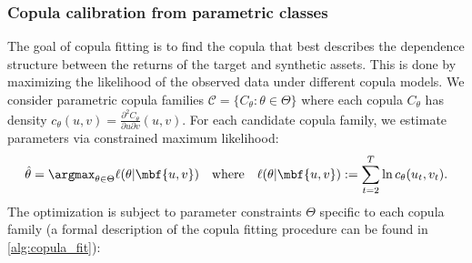 \subsubsection{Copula calibration from parametric classes}

The goal of copula fitting is to find the copula that best describes the dependence structure between the returns of the target and synthetic assets. This is done by maximizing the likelihood of the observed data under different copula models. 
We consider parametric copula families $\mathcal{C} = \{C_\theta : \theta \in \Theta\}$ where each copula $C_\theta$ has density
$
c_\theta(u,v) = \frac{\partial^2 C_\theta}{\partial u \partial v}(u,v)
.
$
For each candidate copula family, we estimate parameters via constrained maximum likelihood:
%
\begin{equation} \label{eq:mle}
\hat{\theta} = \argmax_{\theta \in \Theta} \ell(\theta | \mbf {u,v}) \quad \text{where} \quad 
\ell(\theta| \mbf {u,v}) := \sum_{t=2}^T \ln c_\theta(u_t, v_t)
.
\end{equation}
%
The optimization is subject to parameter constraints $\Theta$ specific to each copula family (a formal description of the copula fitting procedure can be found in \cref{alg:copula_fit}):

